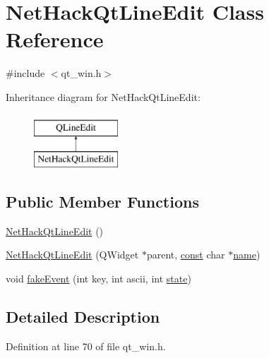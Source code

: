 \hypertarget{classNetHackQtLineEdit}{\section{Net\+Hack\+Qt\+Line\+Edit Class Reference}
\label{classNetHackQtLineEdit}
}


{\ttfamily \#include $<$qt\+\_\+win.\+h$>$}

Inheritance diagram for Net\+Hack\+Qt\+Line\+Edit\+:\begin{figure}[H]
\begin{center}
\leavevmode
\includegraphics[height=2.000000cm]{classNetHackQtLineEdit}
\end{center}
\end{figure}
\subsection*{Public Member Functions}
\begin{DoxyCompactItemize}
\item 
\hyperlink{classNetHackQtLineEdit_a98802e34b4a0741f66a0177e428d966d}{Net\+Hack\+Qt\+Line\+Edit} ()
\item 
\hyperlink{classNetHackQtLineEdit_a0f417707699a9a09f29d5affbbbfa43a}{Net\+Hack\+Qt\+Line\+Edit} (Q\+Widget $\ast$parent, \hyperlink{tradstdc_8h_a2c212835823e3c54a8ab6d95c652660e}{const} char $\ast$\hyperlink{lev__main_8c_a8f8f80d37794cde9472343e4487ba3eb}{name})
\item 
void \hyperlink{classNetHackQtLineEdit_af38654aab158dec4bdbd581be549cb99}{fake\+Event} (int key, int ascii, int \hyperlink{random_8c_a12a8a0122ec9c2b08b4ef888b28f4c15}{state})
\end{DoxyCompactItemize}


\subsection{Detailed Description}


Definition at line 70 of file qt\+\_\+win.\+h.



